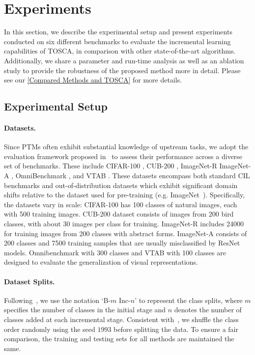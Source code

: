 
\section{Experiments}
In this section, we describe the experimental setup and present experiments conducted on six different benchmarks to evaluate the incremental learning capabilities of TOSCA, in comparison with other state-of-the-art algorithms.
Additionally, we share a parameter and run-time analysis as well as an ablation study to provide the robustness of the proposed method more in detail. 
Please see our \cref{Compared Methods and TOSCA} for more details.

\subsection{Experimental Setup}
\paragraph{Datasets.}
Since PTMs often exhibit substantial knowledge of upstream tasks, we adopt the evaluation framework proposed in~\cite{l2p, dualprompt, codaprompt, simplecil_aper, ease, mos} to assess their performance across a diverse set of benchmarks. These include CIFAR-100 \cite{cifar}, CUB-200 \cite{cub}, ImageNet-R \cite{imagenet-r} ImageNet-A \cite{imagenet-a}, OmniBenchmark \cite{omnibenchmark}, and VTAB \cite{vtab}. These datasets encompass both standard CIL benchmarks and out-of-distribution datasets which exhibit significant domain shifts relative to the dataset used for pre-training (e.g. ImageNet~\cite{imagenet}). Specifically, the datasets vary in scale: CIFAR-100 has 100 classes of natural images, each with 500 training images. CUB-200 dataset consists of images from 200 bird classes, with about 30 images per class for training. ImageNet-R includes 24000 for training images from 200 classes with abstract forms. ImageNet-A consists of 200 classes and 7500 training samples that are usually misclassified by ResNet models. Omnibenchmark with 300 classes and VTAB with 100 classes are designed to evaluate the generalization of visual representations.

\paragraph{Dataset Splits.}
Following~\cite{simplecil_aper, ease, mos}, we use the notation ‘B-$m$ Inc-$n$’ to represent the class splits, where $m$ specifies the number of classes in the initial stage and $n$ denotes the number of classes added at each incremental stage. Consistent with~\cite{icarl}, we shuffle the class order randomly using the seed $1993$ before splitting the data. To ensure a fair comparison, the training and testing sets for all methods are maintained the same.

